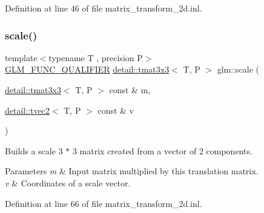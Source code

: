 Definition at line 46 of file matrix\+\_\+transform\+\_\+2d.\+inl.

\mbox{\label{group__gtx__matrix__transform__2d_gaf17588e16120250980b221c2ebdde0eb}} 
\subsubsection{\texorpdfstring{scale()}{scale()}}
{\footnotesize\ttfamily template$<$typename T , precision P$>$ \\
\hyperlink{setup_8hpp_a33fdea6f91c5f834105f7415e2a64407}{G\+L\+M\+\_\+\+F\+U\+N\+C\+\_\+\+Q\+U\+A\+L\+I\+F\+I\+ER} \hyperlink{structglm_1_1detail_1_1tmat3x3}{detail\+::tmat3x3}$<$ T, P $>$ glm\+::scale (\begin{DoxyParamCaption}\item[{\hyperlink{structglm_1_1detail_1_1tmat3x3}{detail\+::tmat3x3}$<$ T, P $>$ const \&}]{m,  }\item[{\hyperlink{structglm_1_1detail_1_1tvec2}{detail\+::tvec2}$<$ T, P $>$ const \&}]{v }\end{DoxyParamCaption})}

Builds a scale 3 $\ast$ 3 matrix created from a vector of 2 components.


\begin{DoxyParams}{Parameters}
{\em m} & Input matrix multiplied by this translation matrix. \\
\hline
{\em v} & Coordinates of a scale vector. \\
\hline
\end{DoxyParams}


Definition at line 66 of file matrix\+\_\+transform\+\_\+2d.\+inl.

\mbox{\label{group__gtx__matrix__transform__2d_gaeac73f42bba3e35100d9a43c40dc0f23}} 
